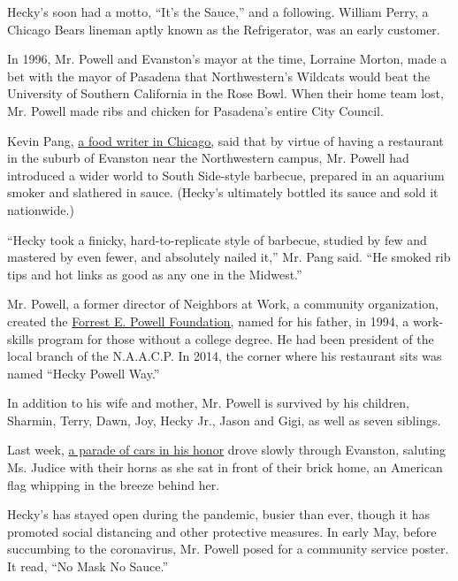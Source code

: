 Hecky's soon had a motto, ``It's the Sauce,'' and a following. William
Perry, a Chicago Bears lineman aptly known as the Refrigerator, was an
early customer.

In 1996, Mr. Powell and Evanston's mayor at the time, Lorraine Morton,
made a bet with the mayor of Pasadena that Northwestern's Wildcats would
beat the University of Southern California in the Rose Bowl. When their
home team lost, Mr. Powell made ribs and chicken for Pasadena's entire
City Council.

Kevin Pang, \href{https://www.saveur.com/chicago-barbecue/}{a food
writer in Chicago,} said that by virtue of having a restaurant in the
suburb of Evanston near the Northwestern campus, Mr. Powell had
introduced a wider world to South Side-style barbecue, prepared in an
aquarium smoker and slathered in sauce. (Hecky's ultimately bottled its
sauce and sold it nationwide.)

``Hecky took a finicky, hard-to-replicate style of barbecue, studied by
few and mastered by even fewer, and absolutely nailed it,'' Mr. Pang
said. ``He smoked rib tips and hot links as good as any one in the
Midwest.''

Mr. Powell, a former director of Neighbors at Work, a community
organization, created the \href{http://forrestepowell.com/}{Forrest E.
Powell Foundation,} named for his father, in 1994, a work-skills program
for those without a college degree. He had been president of the local
branch of the N.A.A.C.P. In 2014, the corner where his restaurant sits
was named ``Hecky Powell Way.''

In addition to his wife and mother, Mr. Powell is survived by his
children, Sharmin, Terry, Dawn, Joy, Hecky Jr., Jason and Gigi, as well
as seven siblings.

Last week, \href{https://www.youtube.com/watch?v=8MYiswrtAdk}{a parade
of cars in his honor} drove slowly through Evanston, saluting Ms. Judice
with their horns as she sat in front of their brick home, an American
flag whipping in the breeze behind her.

Hecky's has stayed open during the pandemic, busier than ever, though it
has promoted social distancing and other protective measures. In early
May, before succumbing to the coronavirus, Mr. Powell posed for a
community service poster. It read, ``No Mask No Sauce.''

\href{https://www.nytimes.com/interactive/2020/obituaries/people-died-coronavirus-obituaries.html?action=click\&pgtype=Article\&state=default\&region=BELOW_MAIN_CONTENT\&context=covid_obits_promo}{}

